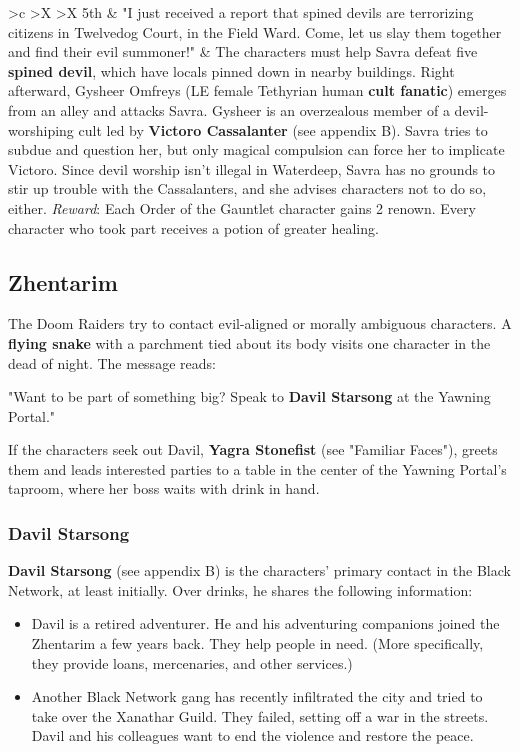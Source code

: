 \documentclass[10pt,a4paper,twoside,twocolumn,openany,nodeprecatedcode]{dndbook}
\begin{document}
\begin{DndTable}{>{\hsize}c >{\hsize}X >{\hsize}X}
5th & "I just received a report that spined devils are terrorizing citizens in Twelvedog Court, in the Field Ward. Come, let us slay them together and find their evil summoner!" & The characters must help Savra defeat five \textbf{spined devil}, which have locals pinned down in nearby buildings. Right afterward, Gysheer Omfreys (LE female Tethyrian human \textbf{cult fanatic}) emerges from an alley and attacks Savra. Gysheer is an overzealous member of a devil-worshiping cult led by \textbf{Victoro Cassalanter} (see appendix B). Savra tries to subdue and question her, but only magical compulsion can force her to implicate Victoro. Since devil worship isn't illegal in Waterdeep, Savra has no grounds to stir up trouble with the Cassalanters, and she advises characters not to do so, either. \textit{Reward}: Each Order of the Gauntlet character gains 2 renown. Every character who took part receives a potion of greater healing.\\
\end{DndTable}


\subsection{Zhentarim}
The Doom Raiders try to contact evil-aligned or morally ambiguous characters. A \textbf{flying snake} with a parchment tied about its body visits one character in the dead of night. The message reads:
\begin{DndReadAloud}{}
"Want to be part of something big? Speak to \textbf{Davil Starsong} at the Yawning Portal."
\end{DndReadAloud}

If the characters seek out Davil, \textbf{Yagra Stonefist} (see "Familiar Faces"), greets them and leads interested parties to a table in the center of the Yawning Portal's taproom, where her boss waits with drink in hand.
\subsubsection{Davil Starsong}
\textbf{Davil Starsong} (see appendix B) is the characters' primary contact in the Black Network, at least initially. Over drinks, he shares the following information:
\begin{itemize}

\item Davil is a retired adventurer. He and his adventuring companions joined the Zhentarim a few years back. They help people in need. (More specifically, they provide loans, mercenaries, and other services.)
\item Another Black Network gang has recently infiltrated the city and tried to take over the Xanathar Guild. They failed, setting off a war in the streets. Davil and his colleagues want to end the violence and restore the peace.
\end{itemize}
\end{document}

